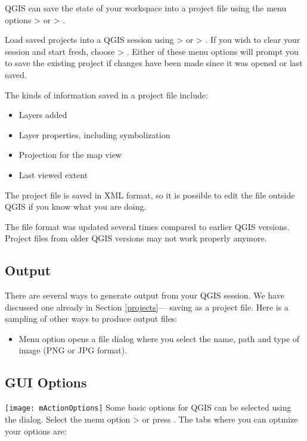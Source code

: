 QGIS can save the state of your workspace into a project file using
the menu options 
 > 
or  > .

Load saved projects into a QGIS session using 
 > 
or  > .
If you wish to clear your session and start fresh, choose
 > .
Either of these menu options will prompt you to save the existing project
if changes have been made since it was opened or last saved.

The kinds of information saved in a project file include:

\begin{itemize}
\item Layers added
\item Layer properties, including symbolization
\item Projection for the map view
\item Last viewed extent
\end{itemize}

The project file is saved in XML format, so it is possible to edit
the file outside QGIS if you know what you are doing.  

The file format was updated several times compared to earlier QGIS versions. Project files 
from older QGIS versions may not work properly anymore.

\subsection{Output}\label{sec:output}
There are several ways to generate output from your QGIS session.
We have discussed one already in Section \ref{projects}---
saving as a project file. Here is a sampling of other ways to produce output files:
\begin{itemize}
\item Menu option  opens a
file dialog where you select the name, path and type of image (PNG or JPG format).
\end{itemize}


\subsection{GUI Options}
\label{subsec:gui_options}
\texttt{[image: mActionOptions]} 
Some basic options for QGIS
can be selected using the  dialog. Select the 
menu option  >
  or press . The tabs where you can 
optmize your options are:

